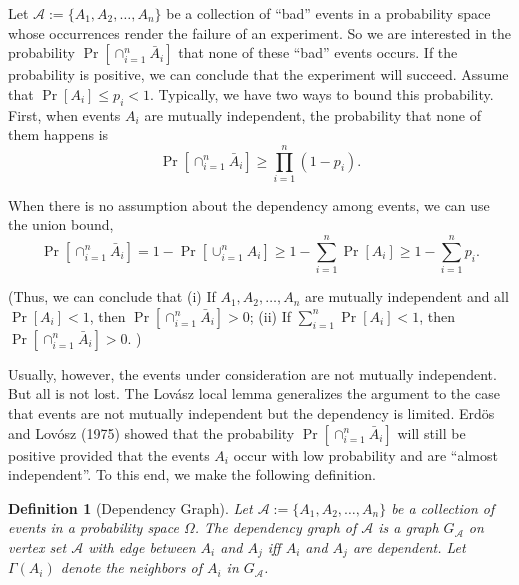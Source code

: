 \documentclass[twoside]{article}
\newtheorem{definition}[theorem]{Definition}
\begin{document}
Let $\mathcal{A}:=\{A_1,A_2,\dots,A_n\}$ be a collection of ``bad'' events in a probability space whose occurrences render the failure of an experiment. So we are interested in the probability $\Pr[\cap_{i=1}^{n}\bar{A}_i]$ that none of these ``bad'' events occurs. If the probability is positive, we can conclude that the experiment will succeed. Assume that $\Pr[A_i]\leq p_i<1$. Typically, we have two ways to bound this probability. First, when events $A_i$ are mutually independent, the probability that none of them happens is
$$\Pr[\cap_{i=1}^{n}\bar{A}_i]\geq\prod_{i=1}^{n}(1-p_i).$$

When there is no assumption about the dependency among events, we can use the union bound,
$$\Pr[\cap_{i=1}^{n}\bar{A}_i]=1-\Pr[\cup_{i=1}^{n}A_i]\geq 1-\sum_{i=1}^{n}\Pr[A_i]\geq 1-\sum_{i=1}^{n} p_i .$$

(Thus, we can conclude that (i) If $A_1,A_2,\dots,A_n$ are mutually independent and all $\Pr[A_i]<1$, then $\Pr[\cap_{i=1}^{n}\bar{A}_i]>0$; (ii) If $\sum_{i=1}^{n}\Pr[A_i]<1$, then $\Pr[\cap_{i=1}^{n}\bar{A}_i]>0$. )

Usually, however, the events under consideration are not mutually independent. But all is not lost. The Lov\'{a}sz local lemma generalizes the argument to the case that events are not mutually independent but the dependency is limited.
Erd\"{o}s and Lov\'{o}sz (1975) showed that the probability $\Pr[\cap_{i=1}^{n}\bar{A}_i]$ will still be positive provided that the events $A_i$ occur with low probability and are ``almost independent''. To this end, we make the following definition.


\begin{definition}[Dependency Graph] Let $\mathcal{A}:=\{A_1,A_2,\dots,A_n\}$ be a collection of events in a probability space $\Omega$. The dependency graph of $\mathcal{A}$ is a graph $G_{\mathcal{A}}$ on vertex set $\mathcal{A}$ with edge between $A_i$ and $A_j$ iff $A_i$ and $A_j$ are dependent. Let $\Gamma(A_i)$ denote the neighbors of $A_i$ in $G_{\mathcal{A}}$.
\end{definition}
\end{document}
